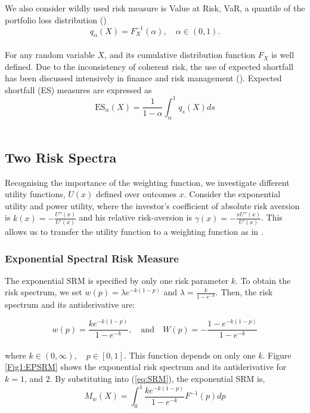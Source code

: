 We also consider wildly used risk measure is Value at Risk, VaR, a quantile of the portfolio loss distribution ({\color{blue}\citealp{jurgen2011statistics}})
\begin{equation}\label{eq:VaR}
q_{\alpha}(X) = F^{-1}_{X}(\alpha), \quad \alpha \in (0,1).
\end{equation}\\
For any random variable $X$, and its cumulative distribution function $F_X$ is well defined.
Due to the inconsistency of coherent risk, the use of expected shortfall has been discussed intensively in finance and risk management ({\color{blue}\citealp{jurgen2011statistics}}). Expected shortfall (ES) measures are expressed as
\begin{equation}\label{eq:ES}
\mbox{ES}_{\alpha}(X) = \frac{1}{1-\alpha}\int^1_{\alpha}q_{s}(X)ds
\end{equation}\\

\subsection{Two Risk Spectra}
Recognising the importance of the weighting function, we investigate different utility functions, $U(x)$ defined over outcomes $x$. Consider the exponential utility and power utility, where the investor's coefficient of absolute risk aversion is $k(x)= -\frac{U''(x)}{U'(x)} $ and his relative risk-aversion is $\gamma(x)=-\frac{xU''(x)}{U'(x)}$. This allows us to transfer the utility function to a weighting function as in {\color{blue}\citet{dowd2008spectral}}.

\subsubsection{Exponential Spectral Risk Measure}
  The exponential SRM is specified by only one risk parameter $k$. To obtain the risk spectrum, we set $ w(p)= \lambda e^{-k(1-p)}$ and $\lambda = \frac{k}{1-e^{-k}}$. Then, the risk spectrum and its antiderivative are: 

\begin{equation}\label{eq:w}
 w(p)=\frac{ke^{-k(1-p)}}{1-e^{-k}},\quad \mbox{and} \quad  W(p)=-\frac{1-e^{-k(1-p)}}{1-e^{-k}}
\end{equation}\\

\noindent where $k \in (0, \infty),\quad p\in [0, 1]$. This function depends on only one $k$. Figure \ref{Fig1:EPSRM} shows the exponential risk spectrum and its antiderivative for $k=1$, and $2$. By substituting into (\ref{eq:SRM}), the exponential SRM is, 
\begin{equation}\label{eq:ESRM}
 M_{w}(X)= \int^1_{0} \frac{ke^{-k(1-p)}}{1-e^{-k}}F^{-1}(p)dp
\end{equation}

